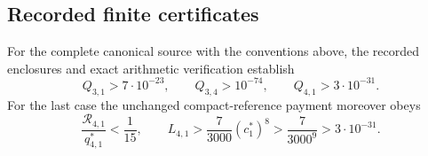 \subsection{Recorded finite certificates}
\begin{proposition}
For the complete canonical source with the conventions above, the
recorded enclosures and exact arithmetic verification establish
\begin{equation}
 Q_{3,1}>7\cdot10^{-23},\qquad
 Q_{3,4}>10^{-74},\qquad
 Q_{4,1}>3\cdot10^{-31}.
 \label{eq:green-certified-Q}
\end{equation}
For the last case the unchanged compact-reference payment moreover obeys
\begin{equation}
 \frac{\mathcal R_{4,1}}{q^*_{4,1}}<\frac1{15},\qquad
 L_{4,1}>\frac7{3000}(c_1^*)^8
          >\frac7{3000^9}>3\cdot10^{-31}.
 \label{eq:green-next-order-margin}
\end{equation}
\end{proposition}
